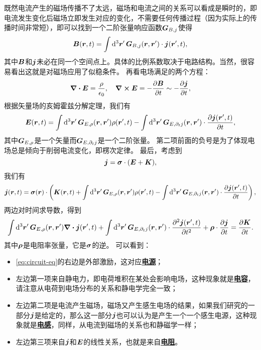 \documentclass[UTF8, a4paper]{ctexart}
\newcommand*{\concept}[1]{\underline{\textbf{#1}}}
\begin{document}
既然电流产生的磁场传播不了太远，磁场和电流之间的关系可以看成是瞬时的，即电流发生变化后磁场立即发生对应的变化，不需要任何传播过程（因为实际上的传播时间非常短），即可以找到一个二阶张量响应函数$\vb*{G}_{B, j}$使得
\[
    \vb*{B}(\vb*{r}, t) = \int \dd[3]{\vb*{r}'} \vb*{G}_{B, j}(\vb*{r}, \vb*{r}') \cdot \vb*{j}(\vb*{r}', t),
\]
其中$\vb*{B}$和$\vb*{j}$未必在同一个空间点上。具体的比例系数取决于电路结构。当然，很容易看出这就是对磁场应用了似稳条件。
再看电场满足的两个方程：
\[
    \div{\vb*{E}} = \frac{\rho}{\epsilon_0}, \quad \curl{\vb*{E}} = - \pdv{\vb*{B}}{t} \sim - \pdv{\vb*{j}}{t},
\]
根据矢量场的亥姆霍兹分解定理，我们有
\[
    \vb*{E}(\vb*{r}, t) = \int \dd[3]{\vb*{r}'} \vb*{G}_{E, \rho}(\vb*{r}, \vb*{r}') \rho(\vb*{r}', t) - \int \dd[3]{\vb*{r}'} \vb*{G}_{E, \partial_t j}(\vb*{r}, \vb*{r}') \cdot \pdv{\vb*{j}(\vb*{r}', t)}{t} ,
\]
其中$\vb*{G}_{E, \rho}$是一个矢量而$\vb*{G}_{E, \partial_t j}$是一个二阶张量。
第二项前面的负号是为了体现电场总是倾向于削弱电流变化，即楞次定律。
最后，考虑到
\[
    \vb*{j} = \vb*{\sigma} \cdot (\vb*{E} + \vb*{K}),
\]
我们有
\[
    \vb*{j}(\vb*{r}, t) = \vb*{\sigma}(\vb*{r}) \cdot \left( \vb*{K}(\vb*{r}, t) + \int \dd[3]{\vb*{r}'} \vb*{G}_{E, \rho}(\vb*{r}, \vb*{r}') \rho(\vb*{r}', t) - \int \dd[3]{\vb*{r}'} \vb*{G}_{E, \partial_t j}(\vb*{r}, \vb*{r}') \cdot \pdv{\vb*{j}(\vb*{r}', t)}{t} \right),
\]
两边对时间求导数，得到
\begin{equation}
    \int \dd[3]{\vb*{r}'} \vb*{G}_{E, \rho}(\vb*{r}, \vb*{r}') \div{\vb*{j}}(\vb*{r}', t) + \int \dd[3]{\vb*{r}'} \vb*{G}_{E, \partial_t j}(\vb*{r}, \vb*{r}') \cdot \pdv[2]{\vb*{j}(\vb*{r}', t)}{t} + \vb*{\rho} \cdot \pdv{\vb*{j}}{t} = \pdv{\vb*{K}}{t}.
    \label{eq:circuit-eq}
\end{equation}
其中$\vb*{\rho}$是电阻率张量，它是$\vb*{\sigma}$的逆。
可以看到：
\begin{itemize}
    \item \eqref{eq:circuit-eq}的右边是外部激励，这对应\concept{电源}；
    \item 左边第一项来自静电力，即电荷堆积在某处会影响电场，这种现象就是\concept{电容}，请注意从电荷到电场分布的关系和静电学完全一致；
    \item 左边第二项是电流产生磁场，磁场又产生感生电场的结果，如果我们研究的一部分$\vb*{j}$是给定的，那么这一部分$\vb*{j}$也可以认为是产生一个一个感生电源，这种现象就是\concept{电感}，同样，从电流到磁场的关系也和静磁学一样；
    \item 左边第三项来自$\vb*{j}$和$\vb*{E}$的线性关系，也就是来自\concept{电阻}。
\end{itemize}
\end{document}
